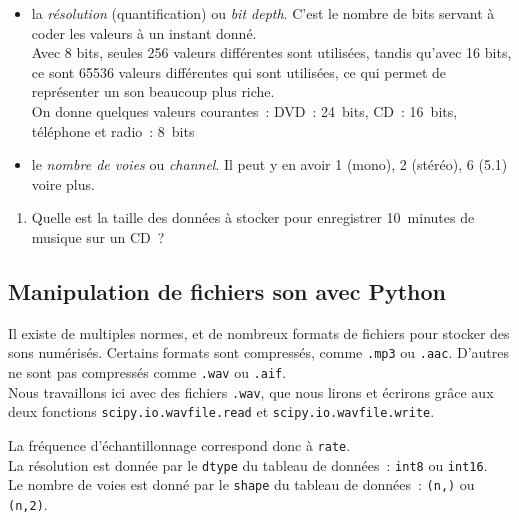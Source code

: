 \documentclass[10pt,fleqn]{article} %
\begin{document}
\begin{multicols}{2}
\begin{itemize}
\item 
  la \emph{résolution} (quantification) ou \emph{bit depth}. C'est le nombre de bits
  servant à coder les valeurs à un instant donné. \\
  Avec 8 bits, seules 256 valeurs différentes sont utilisées, tandis
  qu'avec 16 bits, ce sont 65536 valeurs différentes qui sont
  utilisées, ce qui permet de représenter un son beaucoup plus riche. 
  \\
  On donne quelques valeurs courantes~: DVD~: 24~bits, CD~: 16~bits,
  téléphone et radio~: 8~bits 
\item 
  le \emph{nombre de voies} ou \emph{channel}. Il peut y en avoir 1 (mono), 2
  (stéréo), 6 (5.1) voire plus. 
\end{itemize}

\begin{enumerate}
\item 
  Quelle est la taille des données à stocker pour enregistrer
  10~minutes de musique sur un CD~? 
\end{enumerate}




\subsection*{Manipulation de fichiers son avec Python}

Il existe de multiples normes, et de nombreux formats de fichiers pour
stocker des sons numérisés. Certains formats sont compressés, comme
\texttt{.mp3} ou \texttt{.aac}. D'autres ne sont pas compressés
comme \texttt{.wav} ou \texttt{.aif}. \\
Nous travaillons ici avec des fichiers \texttt{.wav}, que nous lirons
et écrirons grâce aux deux fonctions \verb#scipy.io.wavfile.read# et
\verb#scipy.io.wavfile.write#. 

La fréquence d'échantillonnage correspond donc à \verb#rate#.\\
La
résolution est donnée par le \verb#dtype# du tableau de données~: 
\verb#int8# ou \verb#int16#. \\
Le
nombre de voies est donné par le \verb#shape# du tableau de données~:
\verb#(n,)# ou \verb#(n,2)#. 


\end{multicols}
\end{document}
